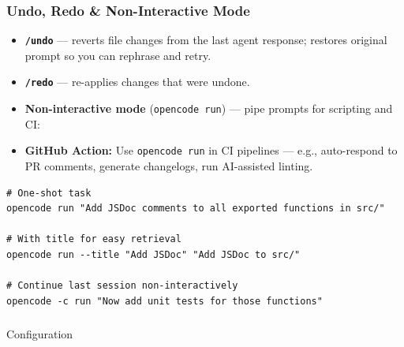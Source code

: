 \begin{frame}[fragile]\frametitle{Undo, Redo \& Non-Interactive Mode}
  \begin{itemize}
    \item \textbf{\texttt{/undo}} --- reverts file changes from the last agent response; restores original prompt so you can rephrase and retry.
    \item \textbf{\texttt{/redo}} --- re-applies changes that were undone.
    \item \textbf{Non-interactive mode} (\texttt{opencode run}) --- pipe prompts for scripting and CI:

    \item \textbf{GitHub Action:} Use \texttt{opencode run} in CI pipelines --- e.g., auto-respond to PR comments, generate changelogs, run AI-assisted linting.
  \end{itemize}
  
\begin{lstlisting}
# One-shot task
opencode run "Add JSDoc comments to all exported functions in src/"

# With title for easy retrieval
opencode run --title "Add JSDoc" "Add JSDoc to src/"

# Continue last session non-interactively
opencode -c run "Now add unit tests for those functions"
\end{lstlisting}
  
\end{frame}

\begin{frame}[fragile]\frametitle{}

\begin{center}
{\Large Configuration}
\end{center}
\end{frame}


